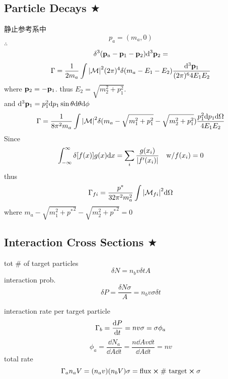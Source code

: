 \documentclass[a4paper]{article}
\DeclareMathOperator{\intdinf}{\int_{-\infty}^\infty}
\numberwithin{equation}{section}
\begin{document}
\subsection{Particle Decays $ \bigstar $}


静止参考系中
\begin{equation}\label{key}
p_a = (m_a, 0)
\end{equation}
$ \therefore $
\begin{equation}\label{key}
\delta^3(\vb{p}_a - \vb{p}_1 - \vb{p}_2)\dd[3]\vb{p}_2 = 
\end{equation}
\begin{equation}\label{key}
\Gamma = \dfrac{1}{2m_a} \int \abs{\mathcal{M}}^2 (2\pi)^4 \delta(m_a - E_1 - E_2)\dfrac{\dd[3]\vb{p}_1}{(2\pi)^6 4E_1E_2} 
\end{equation}
where $ \vb{p}_2 = -\vb{p}_1 $. thus $ E_2 = \sqrt{m_2^2 + p_1^2} $.\\
and $ \dd[3]\vb{p}_1 = p_1^2\dd p_1\sin\theta\dd\theta\dd\phi $
\begin{equation}\label{key}
\Gamma = \dfrac{1}{8\pi^2 m_a} \int \abs{\mathcal{M}}^2 \delta(m_a - \sqrt{m_1^2 + p_1^2} - \sqrt{m_2^2 + p_1^2})\dfrac{p_1^2\dd p_1\dd\Omega}{4E_1E_2} 
\end{equation}
Since
\begin{equation}\label{key}
\intdinf \delta[f(x)]g(x)\dd x = \sum_i\dfrac{g(x_i)}{\abs{f'(x_i)}}  \quad \text{w/} f(x_i)=0
\end{equation}
thus
\begin{equation}\label{key}
\Gamma_{fi} = \dfrac{p^*}{32\pi^2 m_a^2} \int \abs{\mathcal{M}_{fi}}^2 \dd\Omega
\end{equation}
where $ m_a - \sqrt{m_1^2 + {p^*}^2} - \sqrt{m_2^2 + {p^*}^2} = 0 $

\subsection{Interaction Cross Sections $ \bigstar $}
tot \# of target particles
\begin{equation}\label{key}
\delta N = n_b v\delta t A
\end{equation}
interaction prob.
\begin{equation}\label{key}
\delta P = \dfrac{\delta N \sigma}{A} = n_b v \sigma \delta t
\end{equation}

interaction rate per target particle
\begin{equation}\label{key}
\Gamma_b =  \dv{P}{t} = n v \sigma = \sigma \phi_a
\end{equation}
\begin{equation}\label{key}
\phi_a = \dfrac{\dd N_a}{\dd A \dd t} = \dfrac{n\dd A v\dd t}{\dd A\dd t} = n v
\end{equation}
total rate
\begin{equation}\label{key}
\Gamma_a n_a V = (n_a v) (n_b V) \sigma = \text{flux}\cross\text{\# target}\cross\sigma
\end{equation}
\end{document}
